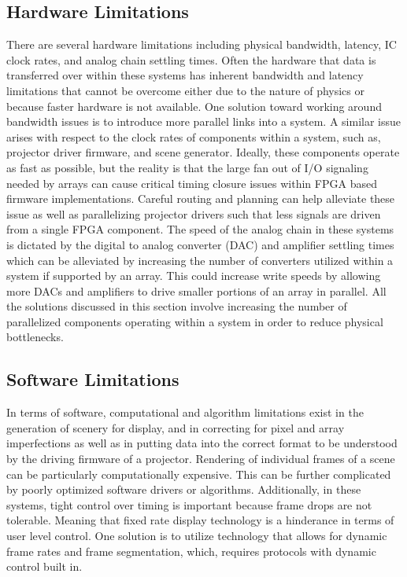     \subsection{Hardware Limitations}
        There are several hardware limitations including physical bandwidth, latency, IC clock rates, and analog chain settling times. Often the hardware that data is transferred over within these systems has inherent bandwidth and latency limitations that cannot be overcome either due to the nature of physics or because faster hardware is not available. One solution toward working around bandwidth issues is to introduce more parallel links into a system. A similar issue arises with respect to the clock rates of components within a system, such as, projector driver firmware, and scene generator. Ideally, these components operate as fast as possible, but the reality is that the large fan out of I/O signaling needed by arrays can cause critical timing closure issues within FPGA based firmware implementations. Careful routing and planning can help alleviate these issue as well as parallelizing projector drivers such that less signals are driven from a single FPGA component. The speed of the analog chain in these systems is dictated by the digital to analog converter (DAC) and amplifier settling times which can be alleviated by increasing the number of converters utilized within a system if supported by an array. This could increase write speeds by allowing more DACs and amplifiers to drive smaller portions of an array in parallel. All the solutions discussed in this section involve increasing the number of parallelized components operating within a system in order to reduce physical bottlenecks.

    \subsection{Software Limitations}
        In terms of software, computational and algorithm limitations exist in the generation of scenery for display, and in correcting for pixel and array imperfections as well as in putting data into the correct format to be understood by the driving firmware of a projector. Rendering of individual frames of a scene can be particularly computationally expensive. This can be further complicated by poorly optimized software drivers or algorithms. Additionally, in these systems, tight control over timing is important because frame drops are not tolerable. Meaning that fixed rate display technology is a hinderance in terms of user level control. One solution is to utilize technology that allows for dynamic frame rates and frame segmentation, which, requires protocols with dynamic control built in.


